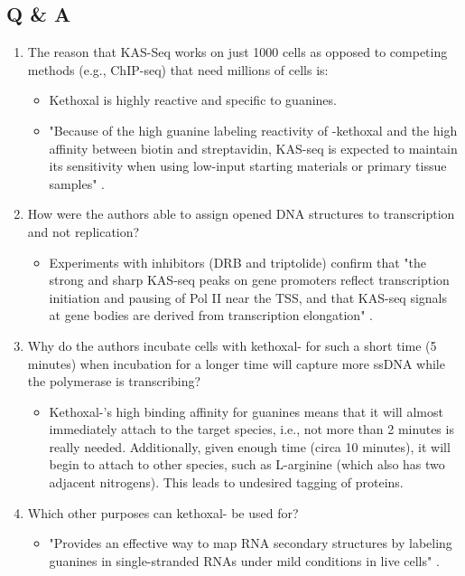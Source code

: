 \documentclass[../notes.tex]{subfiles}
\begin{document}
\subsection*{Q \& A}
\begin{enumerate}
    \item The reason that KAS-Seq works on just 1000 cells as opposed to competing methods (e.g., ChIP-seq) that need millions of cells is:
    \begin{itemize}
        \item Kethoxal is highly reactive and specific to guanines.
        \item "Because of the high guanine labeling reactivity of -kethoxal and the high affinity between biotin and streptavidin, KAS-seq is expected to maintain its sensitivity when using low-input starting materials or primary tissue samples" \parencite[516]{bib:QuizReading}.
    \end{itemize}
    \item How were the authors able to assign opened DNA structures to transcription and not replication?
    \begin{itemize}
        \item Experiments with inhibitors (DRB and triptolide) confirm that "the strong and sharp KAS-seq peaks on gene promoters reflect transcription initiation and pausing of Pol II near the TSS, and that KAS-seq signals at gene bodies are derived from transcription elongation" \parencite[517]{bib:QuizReading}.
    \end{itemize}
    \item Why do the authors incubate cells with kethoxal- for such a short time (5 minutes) when incubation for a longer time will capture more ssDNA while the polymerase is transcribing?
    \begin{itemize}
        \item Kethoxal-'s high binding affinity for guanines means that it will almost immediately attach to the target species, i.e., not more than 2 minutes is really needed. Additionally, given enough time (circa 10 minutes), it will begin to attach to other species, such as L-arginine (which also has two adjacent nitrogens). This leads to undesired tagging of proteins.
    \end{itemize}
    \item Which other purposes can kethoxal- be used for?
    \begin{itemize}
        \item "Provides an effective way to map RNA secondary structures by labeling guanines in single-stranded RNAs under mild conditions in live cells" \parencite[515]{bib:QuizReading}.

\end{itemize}
\end{enumerate}
\end{document}
